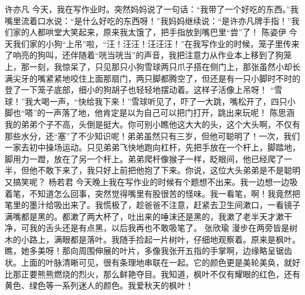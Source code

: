 \markdownRendererInterblockSeparator
{}\markdownRendererInterblockSeparator
{}许亦凡\markdownRendererInterblockSeparator
{}今天，我在写作业时。突然妈妈说了一句话：“我带了一个好吃的东西。”我嘴里流着口水说：“是什么好吃的东西呀！”我妈妈继续说：“是许亦凡牌手指！”我们家的人都哄堂大笑起来，原来我太饿了，把手指放到嘴巴里“尝”了！ \markdownRendererInterblockSeparator
{}\markdownRendererInterblockSeparator
{}陈姿伊\markdownRendererInterblockSeparator
{}今天我们家的小狗“上吊”啦，“汪！汪汪！汪汪汪！”在我写作业的时候，笼子里传来了响亮的狗叫，还伴随着“咣当咣当”的声音，我把注意力从作业本上移到了狗笼上，那一刻，我惊呆了，只见那只小狗雪球两只爪子搭在侧门上，那张虽然小却长满尖牙的嘴紧紧地咬住上面那扇门，两只脚都腾空了，但还是有一只小脚时不时的登了一下笼子底部，细小的狗胡子也轻轻地摆动着。这样子活像上吊呀！\markdownRendererInterblockSeparator
{}“雪球！”我大喝一声，“快给我下来！”雪球听见了，吓了一大跳，嘴松开了，四只小脚也“嗒”的一声落了地，他肯定是以为自己可以把门打开，跳出来玩呢！\markdownRendererInterblockSeparator
{}\markdownRendererInterblockSeparator
{}陈思涵\markdownRendererInterblockSeparator
{}我的弟弟个子不高，头倒是挺大。你可别小瞧他这大大的头，这个大头啊，不仅有那些水分，还“塞”了不少知识呢！弟弟虽然只有三岁，但他可聪明了！一次，我们一家去初中操场运动。只见弟弟飞快地跑向杠杆，先把手放在一个杆上，脚踏地，脚用力一蹬，放在了另一个杆上。弟弟爬杆像猴子一样，眨眼间，他已经爬了一半，但他不敢下来了，我只好上前把他抱了下来。你说，这位大头弟弟是不是聪明又搞笑呢？ \markdownRendererInterblockSeparator
{}\markdownRendererInterblockSeparator
{}杨若君\markdownRendererInterblockSeparator
{}今天晚上我在写作业的时候有个题想不出来。我一边想一边吸着笔，不知道怎么回事，突然觉得嘴里有股很苦的怪味。我一看笔，啊！我竟然把笔里的墨汁给吸出来了。我慌极了，趁爸爸不注意，赶紧去卫生间漱口，一看镜子满嘴都是黑的。都漱了两大杯了，吐出来的唾沫还是黑的，我漱了老半天才漱干净，可我的舌头还是有点黑，以后我再也不敢吸笔了。 \markdownRendererInterblockSeparator
{}\markdownRendererInterblockSeparator
{}张欣瑜\markdownRendererInterblockSeparator
{}漫步在两旁皆是树木的小路上，满眼都是落叶。我随手捡起一片树叶，仔细地观察着。原来是枫叶。瞧，她多美呀！那向周围伸展的叶片，多像我张开五指的手掌啊，边缘略呈锯齿状。上面的叶脉清晰可见，很有条理地串联在一起。它的颜色更是美轮美奂，就好比那正要熊熊燃烧的烈火，那么鲜艳夺目。我知道，枫叶不仅有耀眼的红色，还有黄色、绿色等一系列迷人的颜色。我爱秋天的枫叶！\markdownRendererInterblockSeparator
